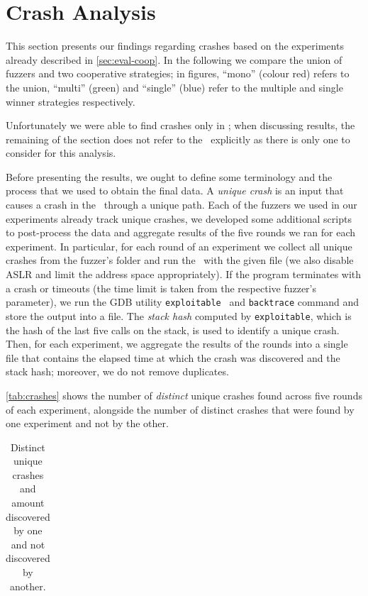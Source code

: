\section{Crash Analysis}
\label{sec:eval-crashes}

This section presents our findings regarding crashes based on the experiments
already described in \autoref{sec:eval-coop}. In the following we compare the
union of fuzzers and two cooperative strategies; in figures, ``mono'' (colour
red) refers to the union, ``multi'' (green) and ``single'' (blue) refer to the
multiple and single winner strategies respectively.

Unfortunately we were able to find crashes only in \listswf; when discussing
results, the remaining of the section does not refer to the \sut\ explicitly as
there is only one to consider for this analysis.

Before presenting the results, we ought to define some terminology and the
process that we used to obtain the final data. A \emph{unique crash} is an input
that causes a crash in the \sut\ through a unique path. Each of the fuzzers we
used in our experiments already track unique crashes, we developed some
additional scripts to post-process the data and aggregate results of the five
rounds we ran for each experiment. In particular, for each round of an
experiment we collect all unique crashes from the fuzzer's folder and run the
\sut\ with the given file (we also disable \ac{ASLR} and limit the address space
appropriately). If the program terminates with a crash or timeouts (the time
limit is taken from the respective fuzzer's parameter), we run the GDB utility
\texttt{exploitable}~\cite{foote2013cert} and \texttt{backtrace} command and
store the output into a file. The \emph{stack hash} computed by
\texttt{exploitable}, which is the hash of the last five calls on the stack, is
used to identify a unique crash. Then, for each experiment, we aggregate the
results of the rounds into a single file that contains the elapsed time at which
the crash was discovered and the stack hash; moreover, we do not remove
duplicates.

\autoref{tab:crashes} shows the number of \emph{distinct} unique crashes found
across five rounds of each experiment, alongside the number of distinct crashes
that were found by one experiment and not by the other.

\begin{table}[h]
    \centering%
    \begin{tabular}{l c c c c}
        
    \end{tabular}
    \caption{Distinct unique crashes and amount discovered by one and not
    discovered by another.}
    \label{tab:crashes}
\end{table}


